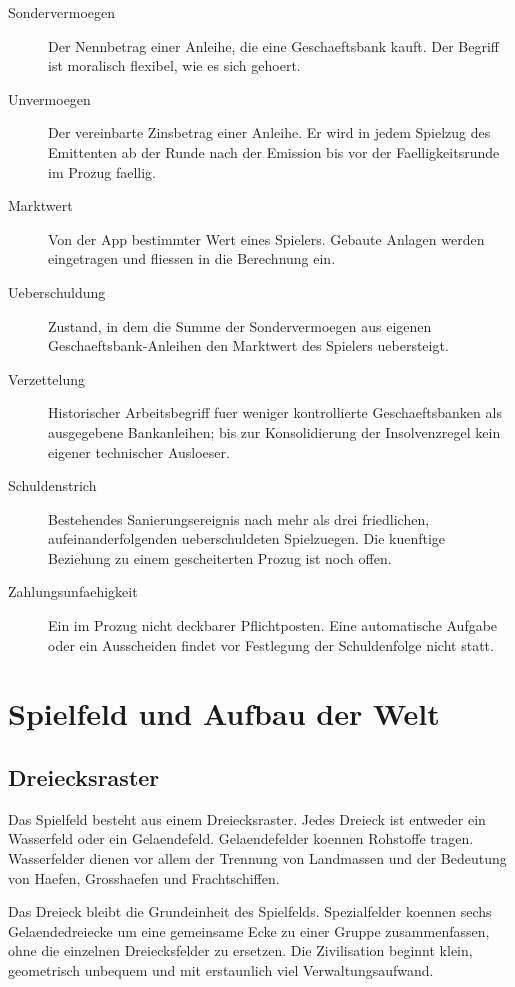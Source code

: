 \documentclass[11pt,a4paper,oneside,parskip=half]{scrreprt}
\begin{document}
\begin{description}
  \item[Sondervermoegen] Der Nennbetrag einer Anleihe, die eine Geschaeftsbank kauft. Der Begriff ist moralisch flexibel, wie es sich gehoert.
  \item[Unvermoegen] Der vereinbarte Zinsbetrag einer Anleihe. Er wird in jedem Spielzug des Emittenten ab der Runde nach der Emission bis vor der Faelligkeitsrunde im Prozug faellig.
  \item[Marktwert] Von der App bestimmter Wert eines Spielers. Gebaute Anlagen werden eingetragen und fliessen in die Berechnung ein.
  \item[Ueberschuldung] Zustand, in dem die Summe der Sondervermoegen aus eigenen Geschaeftsbank-Anleihen den Marktwert des Spielers uebersteigt.
  \item[Verzettelung] Historischer Arbeitsbegriff fuer weniger kontrollierte Geschaeftsbanken als ausgegebene Bankanleihen; bis zur Konsolidierung der Insolvenzregel kein eigener technischer Ausloeser.
  \item[Schuldenstrich] Bestehendes Sanierungsereignis nach mehr als drei friedlichen, aufeinanderfolgenden ueberschuldeten Spielzuegen. Die kuenftige Beziehung zu einem gescheiterten Prozug ist noch offen.
  \item[Zahlungsunfaehigkeit] Ein im Prozug nicht deckbarer Pflichtposten. Eine automatische Aufgabe oder ein Ausscheiden findet vor Festlegung der Schuldenfolge nicht statt.
\end{description}

\chapter{Spielfeld und Aufbau der Welt}

\section{Dreiecksraster}
Das Spielfeld besteht aus einem Dreiecksraster. Jedes Dreieck ist entweder ein Wasserfeld oder ein Gelaendefeld. Gelaendefelder koennen Rohstoffe tragen. Wasserfelder dienen vor allem der Trennung von Landmassen und der Bedeutung von Haefen, Grosshaefen und Frachtschiffen.

Das Dreieck bleibt die Grundeinheit des Spielfelds. Spezialfelder koennen sechs
Gelaendedreiecke um eine gemeinsame Ecke zu einer Gruppe zusammenfassen, ohne
die einzelnen Dreiecksfelder zu ersetzen. Die Zivilisation beginnt klein,
geometrisch unbequem und mit erstaunlich viel Verwaltungsaufwand.
\end{document}
